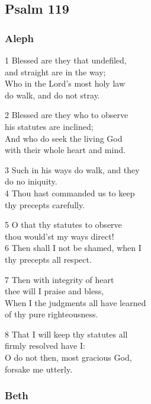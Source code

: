 \begin{center}
\Large{}
\end{center}
\begin{multicols}{3}


\subsection*{Psalm 119}

\subsubsection*{Aleph}

1 Blessed are they that undefiled,\\
and straight are in the way;\\
Who in the Lord’s most holy law\\
do walk, and do not stray.

2 Blessed are they who to observe\\
his statutes are inclined;\\
And who do seek the living God\\
with their whole heart and mind.

3 Such in his ways do walk, and they\\
do no iniquity.\\
4 Thou hast commanded us to keep\\
thy precepts carefully.

5 O that thy statutes to observe\\
thou would’st my ways direct!\\
6 Then shall I not be shamed, when I\\
thy precepts all respect.

7 Then with integrity of heart\\
thee will I praise and bless,\\
When I the judgments all have learned\\
of thy pure righteousness.

8 That I will keep thy statutes all\\
firmly resolved have I:\\
O do not then, most gracious God,\\
forsake me utterly.

\subsubsection*{Beth}


\end{multicols}
